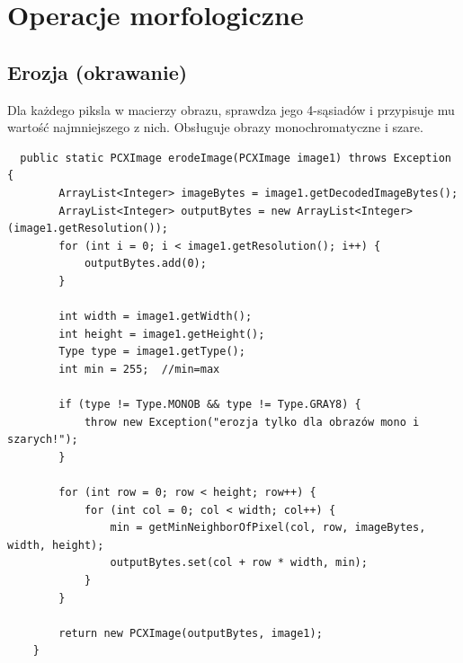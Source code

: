 \documentclass{article}
\begin{document}
	\section{Operacje morfologiczne}
	\subsection{Erozja (okrawanie)}
	Dla każdego piksla w macierzy obrazu, sprawdza jego 4-sąsiadów i przypisuje mu wartość najmniejszego z nich.
	Obsługuje obrazy monochromatyczne i szare.
	
	\begin{verbatim}
  public static PCXImage erodeImage(PCXImage image1) throws Exception {
        ArrayList<Integer> imageBytes = image1.getDecodedImageBytes();
        ArrayList<Integer> outputBytes = new ArrayList<Integer>(image1.getResolution());
        for (int i = 0; i < image1.getResolution(); i++) {
            outputBytes.add(0);
        }

        int width = image1.getWidth();
        int height = image1.getHeight();
        Type type = image1.getType();
        int min = 255;  //min=max

        if (type != Type.MONOB && type != Type.GRAY8) {
            throw new Exception("erozja tylko dla obrazów mono i szarych!");
        }

        for (int row = 0; row < height; row++) {
            for (int col = 0; col < width; col++) {
                min = getMinNeighborOfPixel(col, row, imageBytes, width, height);
                outputBytes.set(col + row * width, min);
            }
        }

        return new PCXImage(outputBytes, image1);
    }
	\end{verbatim}
	
\end{document}
